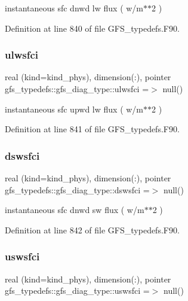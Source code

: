 instantaneous sfc dnwd lw flux ( w/m$\ast$$\ast$2 ) 



Definition at line 840 of file G\+F\+S\+\_\+typedefs.\+F90.

\mbox{\label{structgfs__typedefs_1_1gfs__diag__type_a163d04dbbc29aee4f987c27e9f811416}} 
\subsubsection{ulwsfci}
{\footnotesize\ttfamily real (kind=kind\+\_\+phys), dimension(\+:), pointer gfs\+\_\+typedefs\+::gfs\+\_\+diag\+\_\+type\+::ulwsfci =$>$ null()}



instantaneous sfc upwd lw flux ( w/m$\ast$$\ast$2 ) 



Definition at line 841 of file G\+F\+S\+\_\+typedefs.\+F90.

\mbox{\label{structgfs__typedefs_1_1gfs__diag__type_a57302a883c3ac67a70da1ca7d62ef979}} 
\subsubsection{dswsfci}
{\footnotesize\ttfamily real (kind=kind\+\_\+phys), dimension(\+:), pointer gfs\+\_\+typedefs\+::gfs\+\_\+diag\+\_\+type\+::dswsfci =$>$ null()}



instantaneous sfc dnwd sw flux ( w/m$\ast$$\ast$2 ) 



Definition at line 842 of file G\+F\+S\+\_\+typedefs.\+F90.

\mbox{\label{structgfs__typedefs_1_1gfs__diag__type_ac9c1e2027f515f2c6c9cb416aaff28f5}} 
\subsubsection{uswsfci}
{\footnotesize\ttfamily real (kind=kind\+\_\+phys), dimension(\+:), pointer gfs\+\_\+typedefs\+::gfs\+\_\+diag\+\_\+type\+::uswsfci =$>$ null()}




